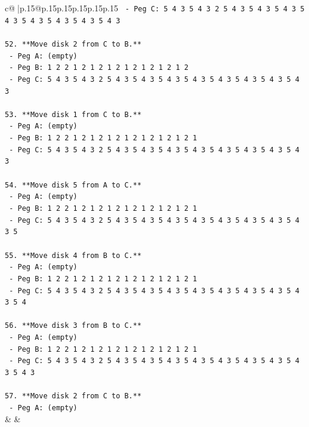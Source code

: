 \documentclass{article}
\begin{document}
{\begin{supertabular}{c@{$\;$}|p{.15\linewidth}@{}p{.15\linewidth}p{.15\linewidth}p{.15\linewidth}p{.15\linewidth}p{.15\linewidth}}
{{{\texttt{    {-} Peg C: 5 4 3 5 4 3 2 5 4 3 5 4 3 5 4 3 5 4 3 5 4 3 5 4 3 5 4 3 5 4 3} \\
\\ 
\texttt{52. **Move disk 2 from C to B.**} \\
\texttt{    {-} Peg A: (empty)} \\
\texttt{    {-} Peg B: 1 2 2 1 2 1 2 1 2 1 2 1 2 1 2 1 2} \\
\texttt{    {-} Peg C: 5 4 3 5 4 3 2 5 4 3 5 4 3 5 4 3 5 4 3 5 4 3 5 4 3 5 4 3 5 4 3} \\
\\ 
\texttt{53. **Move disk 1 from C to B.**} \\
\texttt{    {-} Peg A: (empty)} \\
\texttt{    {-} Peg B: 1 2 2 1 2 1 2 1 2 1 2 1 2 1 2 1 2 1} \\
\texttt{    {-} Peg C: 5 4 3 5 4 3 2 5 4 3 5 4 3 5 4 3 5 4 3 5 4 3 5 4 3 5 4 3 5 4 3} \\
\\ 
\texttt{54. **Move disk 5 from A to C.**} \\
\texttt{    {-} Peg A: (empty)} \\
\texttt{    {-} Peg B: 1 2 2 1 2 1 2 1 2 1 2 1 2 1 2 1 2 1} \\
\texttt{    {-} Peg C: 5 4 3 5 4 3 2 5 4 3 5 4 3 5 4 3 5 4 3 5 4 3 5 4 3 5 4 3 5 4 3 5} \\
\\ 
\texttt{55. **Move disk 4 from B to C.**} \\
\texttt{    {-} Peg A: (empty)} \\
\texttt{    {-} Peg B: 1 2 2 1 2 1 2 1 2 1 2 1 2 1 2 1 2 1} \\
\texttt{    {-} Peg C: 5 4 3 5 4 3 2 5 4 3 5 4 3 5 4 3 5 4 3 5 4 3 5 4 3 5 4 3 5 4 3 5 4} \\
\\ 
\texttt{56. **Move disk 3 from B to C.**} \\
\texttt{    {-} Peg A: (empty)} \\
\texttt{    {-} Peg B: 1 2 2 1 2 1 2 1 2 1 2 1 2 1 2 1 2 1} \\
\texttt{    {-} Peg C: 5 4 3 5 4 3 2 5 4 3 5 4 3 5 4 3 5 4 3 5 4 3 5 4 3 5 4 3 5 4 3 5 4 3} \\
\\ 
\texttt{57. **Move disk 2 from C to B.**} \\
\texttt{    {-} Peg A: (empty)} \\
            }
        }
    }
    & & \\ \\


\end{supertabular}}
\end{document}
